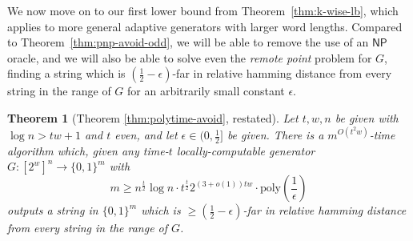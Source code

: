 \documentclass[11pt]{article}
\newtheorem*{theorem*}{Theorem}
\newcommand{\B}{\{0,1\}}
\newcommand{\poly}{\mathrm{poly}}
\begin{document}
We now move on to our first lower bound from Theorem~\ref{thm:k-wise-lb}, which applies to more general adaptive generators with larger word lengths. Compared to Theorem~\ref{thm:pnp-avoid-odd}, we will be able to remove the use of an $\mathsf{NP}$ oracle, and we will also be able to solve even the \emph{remote point} problem for $G$, finding a string which is $(\frac{1}{2} -\epsilon)$-far in relative hamming distance from every string in the range of $G$ for an arbitrarily small constant $\epsilon$.
\begin{theorem*}[Theorem \ref{thm:polytime-avoid}, restated]
Let $t,w,n$ be given with $\log n > tw+1$ and $t$ even, and let $\epsilon \in (0,\frac{1}{2}]$ be given. There is a $m^{O(t^2 w)}$-time algorithm which, given any time-$t$ locally-computable generator $G: [2^w]^n \to \B^m$ with
\[
m \geq  n^{\frac{t}{2}} \log n \cdot t^{\frac{t}{2}}2^{(3+o(1))tw} \cdot \poly(\frac{1}{\epsilon})
\]
outputs a string in $\B^m$ which is $\geq (\frac{1}{2}-\epsilon)$-far in relative hamming distance from every string in the range of $G$.
\end{theorem*}
\end{document}
